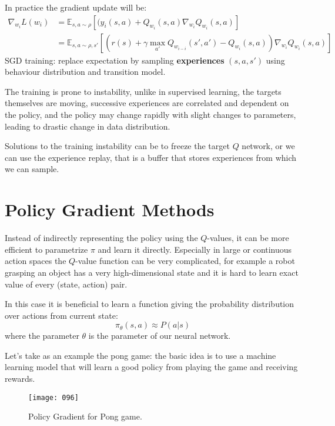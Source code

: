 In practice the gradient update will be:
\begin{align}
    \nabla_{w_i} L(w_i) &= \mathbb{E}_{s, a \sim \rho} \left[
        (y_i(s,a) + Q_{w_i}(s,a) \nabla_{w_i} Q_{w_i} (s,a)
    \right]\\
    &= \mathbb{E}_{s, a \sim \rho, s'} \left[
        (r(s) + \gamma \max_{a'} Q_{w_{i-i}}(s',a') - Q_{w_i} (s,a)) \nabla_{w_i} Q_{w_i} (s,a)
    \right]
\end{align}
SGD training: replace expectation by sampling \textbf{experiences} \((s,a,s')\) using behaviour distribution and transition model.

The training is prone to instability, unlike in supervised learning, the targets themselves are moving, successive experiences are correlated and dependent on the policy, and the policy may change rapidly with slight changes to parameters, leading to drastic change in data distribution.

Solutions to the training instability can be to freeze the target \(Q\) network, or we can use the experience replay, that is a buffer that stores experiences from which we can sample.

\section{Policy Gradient Methods}
Instead of indirectly representing the policy using the \(Q\)-values, it can be more efficient to parametrize \(\pi\) and learn it directly. Especially in large or continuous action spaces the \(Q\)-value function can be very complicated, for example a robot grasping an object has a very high-dimensional state and it is hard to learn exact value of every (state, action) pair.

In this case it is beneficial to learn a function giving the probability distribution over actions from current state:
\begin{equation}
    \pi_\theta (s,a) \approx P(a|s)
\end{equation}
where the parameter \(\theta\) is the parameter of our neural network.

Let's take as an example the pong game: the basic idea is to use a machine learning model that will learn a good policy from playing the game and receiving rewards.
\begin{figure}[t!]
    \centering
    \texttt{[image: 096]}
    \caption{Policy Gradient for Pong game.}
    \label{fig:096}
\end{figure}

